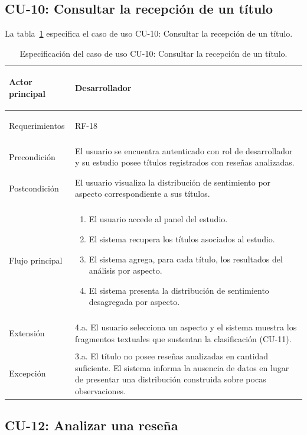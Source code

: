 \subsection{CU-10: Consultar la recepción de un título}\label{subsec:cu10}

La tabla~\ref{tab:cu10} especifica el caso de uso CU-10: Consultar la recepción de un título.

\begin{longtable}{|>{\bfseries\raggedright\arraybackslash}p{2.8cm}|>{\raggedright\arraybackslash}p{10cm}|}
	\caption{Especificación del caso de uso CU-10: Consultar la recepción de un título.}\label{tab:cu10} \\
	\hline
	\endfirsthead
	\hline
	\endfoot
	\hline
	\endlastfoot
	Actor principal & Desarrollador \\
	\hline
	Requerimientos & RF-18 \\
	\hline
	Precondición & El usuario se encuentra autenticado con rol de desarrollador y su estudio posee títulos registrados con reseñas analizadas. \\
	\hline
	Postcondición & El usuario visualiza la distribución de sentimiento por aspecto correspondiente a sus títulos. \\
	\hline
	Flujo principal &
	\begin{enumerate}[leftmargin=1.1em, itemsep=2pt, topsep=2pt]
		\item El usuario accede al panel del estudio.
		\item El sistema recupera los títulos asociados al estudio.
		\item El sistema agrega, para cada título, los resultados del análisis por aspecto.
		\item El sistema presenta la distribución de sentimiento desagregada por aspecto.
	\end{enumerate} \\
	\hline
	Extensión & 4.a. El usuario selecciona un aspecto y el sistema muestra los fragmentos textuales que sustentan la clasificación (CU-11). \\
	\hline
	Excepción & 3.a. El título no posee reseñas analizadas en cantidad suficiente. El sistema informa la ausencia de datos en lugar de presentar una distribución construida sobre pocas observaciones. \\
\end{longtable}

\subsection{CU-12: Analizar una reseña}\label{subsec:cu12}

